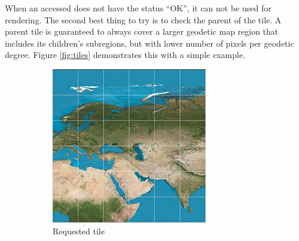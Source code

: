 When an accessed  does not have the status ``OK'', it can not be used for rendering. The second best thing to try is to check the parent of the tile. A parent tile is guaranteed to always cover a larger geodetic map region that includes its children's subregions, but with lower number of pixels per geodetic degree. Figure \ref{fig:tiles} demonstrates this with a simple example.

\begin{figure}[htbp]
    \centering
    \begin{subfigure}[t]{0.3\textwidth}
        \includegraphics[width=\textwidth]{figures/implementation/chunktile/chunktile1.jpg}
        \caption{Requested tile}
    \end{subfigure}
    \quad
    \begin{subfigure}[t]{0.3\textwidth}

\end{subfigure}
\end{figure}
